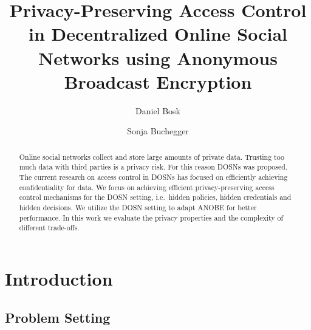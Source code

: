 \title{%
  Privacy-Preserving Access Control in
  Decentralized Online Social Networks using
  Anonymous Broadcast Encryption
}
\author{%
  Daniel Bosk \and
  Sonja Buchegger
}


\mode* %

\begin{abstract}
  Online social networks collect and store large amounts of private data.
  Trusting too much data with third parties is a privacy risk.
  For this reason \acp{DOSN} was proposed.
  The current research on access control in \acp{DOSN} has focused on 
  efficiently achieving confidentiality for data.
  We focus on achieving efficient privacy-preserving access control mechanisms 
  for the \ac{DOSN} setting, i.e.~hidden policies, hidden credentials and 
  hidden decisions.
  We utilize the \ac{DOSN} setting to adapt \ac{ANOBE} for better performance.
  In this work we evaluate the privacy properties and the complexity of 
  different trade-offs.

\end{abstract}

\acresetall{}
\section{Introduction}

\subsection<presentation>{Problem Setting}

